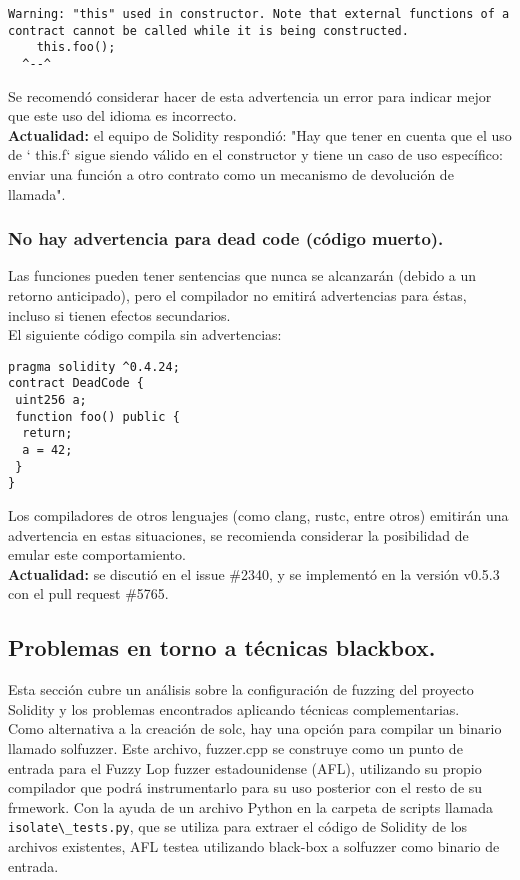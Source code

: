 \begin{lstlisting}
Warning: "this" used in constructor. Note that external functions of a contract cannot be called while it is being constructed.
	this.foo();
  ^--^
\end{lstlisting}  

Se recomendó considerar hacer de esta advertencia un error para indicar mejor que este uso del idioma es incorrecto.\\

\textbf{Actualidad:} el equipo de Solidity respondió: "Hay que tener en cuenta que el uso de ` this.f` sigue siendo válido en el constructor y tiene un caso de uso específico: enviar una función a otro contrato como un mecanismo de devolución de llamada".

\subsubsection{No hay advertencia para dead code (código muerto).}

Las funciones pueden tener sentencias que nunca se alcanzarán (debido a un retorno anticipado), pero el compilador no emitirá advertencias para éstas, incluso si tienen efectos secundarios.\\
 El siguiente código compila sin advertencias:

\begin{lstlisting}[language=Solidity] 
pragma solidity ^0.4.24;
contract DeadCode {
 uint256 a;
 function foo() public {
  return;
  a = 42;
 }
}
\end{lstlisting}

Los compiladores de otros lenguajes (como clang, rustc, entre otros) emitirán una advertencia en estas situaciones, se recomienda considerar la posibilidad de emular este comportamiento.\\

\textbf{Actualidad:} se discutió en el issue \#2340, y se implementó en la versión v0.5.3 con el pull request \#5765.

\subsection{Problemas en torno a técnicas blackbox.}

Esta sección cubre un análisis sobre la configuración de fuzzing del proyecto Solidity y los problemas encontrados aplicando técnicas complementarias.\\

Como alternativa a la creación de solc, hay una opción para compilar un binario llamado solfuzzer. Este archivo, fuzzer.cpp se construye como un punto de entrada para el Fuzzy Lop fuzzer estadounidense (AFL), utilizando su propio compilador que podrá instrumentarlo para su uso posterior con el resto de su frmework. Con la ayuda de un archivo Python en la carpeta de scripts llamada \verb|isolate\_tests.py|, que se utiliza para extraer el código de Solidity de los archivos existentes, AFL testea utilizando black-box a solfuzzer como binario de entrada.


